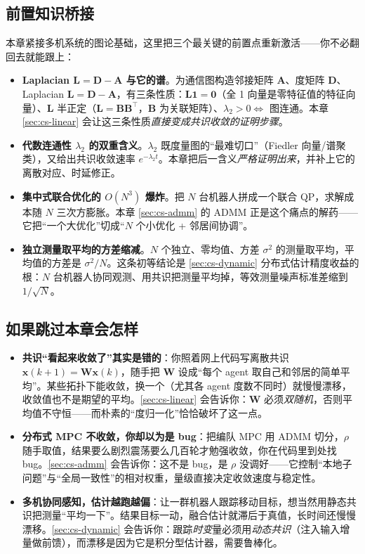 \subsection*{前置知识桥接}
本章紧接多机系统的图论基础，这里把三个最关键的前置点重新激活——你不必翻回去就能跟上：
\begin{itemize}
  \item \textbf{Laplacian $\mathbf{L}=\mathbf{D}-\mathbf{A}$ 与它的谱}。为通信图构造邻接矩阵 $\mathbf{A}$、度矩阵 $\mathbf{D}$、Laplacian $\mathbf{L}=\mathbf{D}-\mathbf{A}$，有三条性质：$\mathbf{L}\mathbf{1}=\mathbf{0}$（全 1 向量是零特征值的特征向量）、$\mathbf{L}$ 半正定（$\mathbf{L}=\mathbf{B}\mathbf{B}^\top$，$\mathbf{B}$ 为关联矩阵）、$\lambda_2>0\iff$ 图连通。本章 \cref{sec:cs-linear} 会让这三条性质\emph{直接变成共识收敛的证明步骤}。
  \item \textbf{代数连通性 $\lambda_2$ 的双重含义}。$\lambda_2$ 既度量图的“最难切口”（Fiedler 向量/谱聚类），又给出共识收敛速率 $e^{-\lambda_2 t}$。本章把后一含义\emph{严格证明出来}，并补上它的离散对应、时延修正。
  \item \textbf{集中式联合优化的 $O(N^3)$ 爆炸}。把 $N$ 台机器人拼成一个联合 QP，求解成本随 $N$ 三次方膨胀。本章 \cref{sec:cs-admm} 的 ADMM 正是这个痛点的解药——它把“一个大优化”切成“$N$ 个小优化 + 邻居间协调”。
  \item \textbf{独立测量取平均的方差缩减}。$N$ 个独立、零均值、方差 $\sigma^2$ 的测量取平均，平均值的方差是 $\sigma^2/N$。这条初等结论是 \cref{sec:cs-dynamic} 分布式估计精度收益的根：$N$ 台机器人协同观测、用共识把测量平均掉，等效测量噪声标准差缩到 $1/\sqrt N$。
\end{itemize}

\subsection*{如果跳过本章会怎样}
\begin{itemize}
  \item \textbf{共识“看起来收敛了”其实是错的}：你照着网上代码写离散共识 $\mathbf{x}(k{+}1)=\mathbf{W}\mathbf{x}(k)$，随手把 $\mathbf{W}$ 设成“每个 agent 取自己和邻居的简单平均”。某些拓扑下能收敛，换一个（尤其各 agent 度数不同时）就慢慢漂移，收敛值也不是期望的平均。\cref{sec:cs-linear} 会告诉你：$\mathbf{W}$ 必须\emph{双随机}，否则平均值不守恒——而朴素的“度归一化”恰恰破坏了这一点。
  \item \textbf{分布式 MPC 不收敛，你却以为是 bug}：把编队 MPC 用 ADMM 切分，$\rho$ 随手取值，结果要么剧烈震荡要么几百轮才勉强收敛，你在代码里到处找 bug。\cref{sec:cs-admm} 会告诉你：这不是 bug，是 $\rho$ 没调好——它控制“本地子问题”与“全局一致性”的相对权重，量级直接决定收敛速度与稳定性。
  \item \textbf{多机协同感知，估计越跑越偏}：让一群机器人跟踪移动目标，想当然用静态共识把测量“平均一下”。结果目标一动，融合估计就滞后于真值，长时间还慢慢漂移。\cref{sec:cs-dynamic} 会告诉你：跟踪\emph{时变}量必须用\emph{动态共识}（注入输入增量做前馈），而漂移是因为它是积分型估计器，需要鲁棒化。
\end{itemize}


